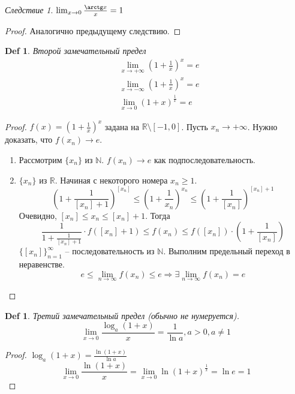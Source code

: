 \documentclass[12pt]{article}
\newenvironment{MyList}[1][4pt]{
  \begin{enumerate}[1.]
  \setlength{\parskip}{0pt}
  \setlength{\itemsep}{#1}
}{       
  \end{enumerate}
}
\def\N{\mathbb{N}}       %
\def\R{\mathbb{R}}       %
\def\SO{\Rightarrow}     %
\theoremstyle{definition} %
\theoremstyle{plain} %
\newtheorem{Def}[Thm]{Def} %
\theoremstyle{remark} %
\newtheorem{Cons}[Thm]{Следствие} %
\begin{document}
\begin{Cons}
    $\lim_{x \to 0} \frac{\arctg x}{x} = 1$ 
\end{Cons}

\begin{proof}
    Аналогично предыдущему следствию.
\end{proof}

\begin{Def}
    Второй замечательный предел
    \begin{align*}
        &\lim_{x \to +\infty} \left(1 + \frac{1}{x}\right)^x = e \\
        &\lim_{x \to -\infty} \left(1 + \frac{1}{x}\right)^x = e \\
        &\lim_{x \to 0}(1 + x)^{\frac{1}{x}} = e
    \end{align*}
\end{Def}

\begin{proof}
    $f(x) = \left(1 + \frac{1}{x}\right)^x$ задана на $\R \setminus [-1, 0]$. Пусть $x_n \to +\infty$. Нужно доказать, что $f(x_n) \to e$.
    
    \begin{MyList}
        \item Рассмотрим $\{x_n\}$ из $\N$. $f(x_n) \to e$ как подпоследовательность.
        \item $\{x_n\}$ из $\R$. Начиная с некоторого номера $x_n \geqslant 1$.
        \[\left(1 + \frac{1}{[x_n] + 1}\right)^{[x_n]} \leqslant \left(1 + \frac{1}{x_n}\right)^{x_n} \leqslant \left(1 + \frac{1}{[x_n]}\right)^{[x_n] + 1}\]
        Очевидно, $[x_n] \leqslant x_n \leqslant [x_n] + 1$. Тогда
        \[\frac{1}{1 + \frac{1}{[x_n] + 1}} \cdot f([x_n] + 1) \leqslant f(x_n) \leqslant f([x_n]) \cdot \left(1 + \frac{1}{[x_n]}\right)\] 
        $\{[x_n]\}_{n = 1}^\infty$ -- последовательность из $\N$. Выполним предельный переход в неравенстве.
        \[e \leqslant \lim_{n \to \infty} f(x_n) \leqslant e \SO \exists \lim_{n \to \infty} f(x_n) = e\]  
    \end{MyList}
\end{proof}

\begin{Def}
    Третий замечательный предел (обычно не нумеруется).
    \[\lim_{x \to 0} \frac{\log_a (1 + x)}{x} = \frac{1}{\ln a}, a > 0, a \neq 1\]
\end{Def}

\begin{proof}
    $\log_a (1 + x) = \frac{\ln (1 + x)}{\ln a}$ 
    \[\lim_{x \to 0} \frac{\ln (1 + x)}{x} = \lim_{x \to 0} \ln (1 + x)^{\frac{1}{x}} = \ln e = 1\]
\end{proof}
\end{document}
